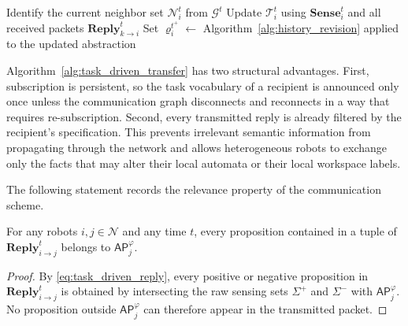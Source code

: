 \begin{algorithm}[t]
\caption{Task-driven transfer and local revision at robot $i$}
\label{alg:task_driven_transfer}
\DontPrintSemicolon
{}
Identify the current neighbor set $\mathcal{N}_{i}^{t}$ from
$\mathcal{G}^{t}$\;
Update $\mathcal{T}_{i}^{t}$ using $\mathbf{Sense}_{i}^{t}$ and all received
packets $\mathbf{Reply}_{k \rightarrow i}^{t}$\;
Set $\varrho_{i}^{t^{+}} \leftarrow$
Algorithm~\ref{alg:history_revision} applied to the updated abstraction\;
\;
\end{algorithm}

Algorithm~\ref{alg:task_driven_transfer} has two structural advantages. First,
subscription is persistent, so the task vocabulary of a recipient is announced
only once unless the communication graph disconnects and reconnects in a way
that requires re-subscription. Second, every transmitted reply is already
filtered by the recipient's specification. This prevents irrelevant semantic
information from propagating through the network and allows heterogeneous robots
to exchange only the facts that may alter their local automata or their local
workspace labels.

The following statement records the relevance property of the communication
scheme.

\begin{lemma}
\label{lem:task_relevance_transfer}
For any robots $i,j \in \mathcal{N}$ and any time $t$, every proposition
contained in a tuple of $\mathbf{Reply}_{i \rightarrow j}^{t}$ belongs to
$\mathsf{AP}_{j}^{\varphi}$.
\end{lemma}

\begin{proof}
By \eqref{eq:task_driven_reply}, every positive or negative proposition in
$\mathbf{Reply}_{i \rightarrow j}^{t}$ is obtained by intersecting the raw
sensing sets $\Sigma^{+}$ and $\Sigma^{-}$ with
$\mathsf{AP}_{j}^{\varphi}$. No proposition outside
$\mathsf{AP}_{j}^{\varphi}$ can therefore appear in the transmitted packet.
\end{proof}

